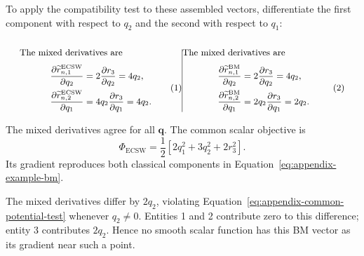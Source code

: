 \documentclass[a4paper,12pt]{article}
\newcommand{\vect}[1]{\boldsymbol{#1}}
\begin{document}
To apply the compatibility test to these assembled vectors, differentiate the first component with respect to $q_2$ and the second with respect to $q_1$:

\begin{subequations}
 \label{eq:appendix-example-cross-partials}
 \noindent
 \begin{minipage}[t]{0.48\linewidth}
  \vspace{0pt}\small\raggedright
  The mixed derivatives are
  \begin{equation}
   \begin{aligned}
    \frac{\partial\widetilde r_{n,1}^{\mathrm{ECSW}}}{\partial q_2}
     &=2\frac{\partial r_3}{\partial q_2}=4q_2,\\
    \frac{\partial\widetilde r_{n,2}^{\mathrm{ECSW}}}{\partial q_1}
     &=4q_2\frac{\partial r_3}{\partial q_1}=4q_2.
   \end{aligned}
  \end{equation}
 \end{minipage}\hfill\vrule width 0.4pt\hfill%
 \begin{minipage}[t]{0.48\linewidth}
  \vspace{0pt}\small\raggedright
  The mixed derivatives are
  \begin{equation}
   \begin{aligned}
    \frac{\partial\widetilde r_{n,1}^{\mathrm{BM}}}{\partial q_2}
     &=2\frac{\partial r_3}{\partial q_2}=4q_2,\\
    \frac{\partial\widetilde r_{n,2}^{\mathrm{BM}}}{\partial q_1}
     &=2q_2\frac{\partial r_3}{\partial q_1}=2q_2.
   \end{aligned}
  \end{equation}
 \end{minipage}
\end{subequations}


\noindent
\begin{minipage}[t]{0.48\linewidth}
 \vspace{0pt}\small\raggedright
 The mixed derivatives agree for all $\vect{q}$. The common scalar objective is
 \[
  \Phi_{\mathrm{ECSW}}
  =\frac12\left[2q_1^2+3q_2^2+2r_3^2\right].
 \]
 Its gradient reproduces both classical components in Equation~\eqref{eq:appendix-example-bm}.
\end{minipage}\hfill\vrule width 0.4pt\hfill%
\begin{minipage}[t]{0.48\linewidth}
 \vspace{0pt}\small\raggedright
 The mixed derivatives differ by $2q_2$, violating Equation~\eqref{eq:appendix-common-potential-test} whenever $q_2\ne0$. Entities 1 and 2 contribute zero to this difference; entity 3 contributes $2q_2$. Hence no smooth scalar function has this BM vector as its gradient near such a point.
\end{minipage}
\end{document}
